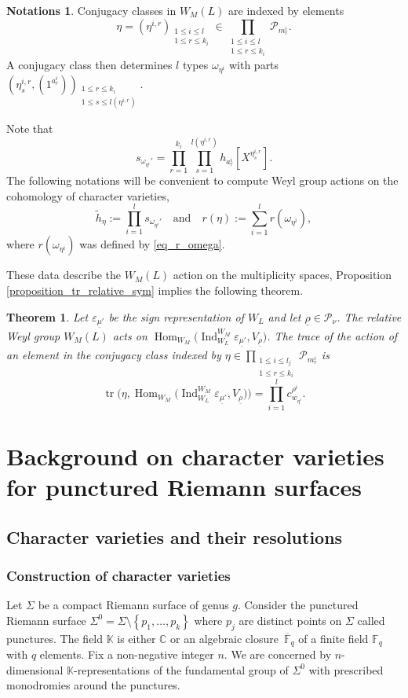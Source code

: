 \documentclass[11pt]{article}
\newcommand{\Subsection}{\subsection}
\newcommand{\quand}{\quad\text{and}\quad}
\let\epsilon\varepsilon
\theoremstyle{definition}
\newtheorem{notations}[definition]{Notations}
\theoremstyle{plain}
\newtheorem{theorem}[definition]{Theorem}
\DeclareMathOperator{\Hom}{Hom}
\DeclareMathOperator{\Ind}{Ind}
\DeclareMathOperator{\tr}{tr}
\newcommand{\C}{\mathbb{C}}
\newcommand{\Fq}{\mathbb{F}_q}
\newcommand{\Fqbar}{\overline{\mathbb{F}}_q}
\newcommand{\Part}{\mathcal{P}}
\begin{document}
\begin{notations}\label{notations_h_tilde}
Conjugacy classes in $W_M(L)$ are indexed by elements
\[
\eta=(\eta^{i,r})_{\substack{ 1 \le i \le l\\ 1 \le r \le k_{i}}} \in \prod_{\substack{ 1 \le i \le l \\ 1 \le r \le k_{i}}} \Part_{m^{i}_{r}}.
\]
A conjugacy class then determines $l$ types
$\omega_{\eta^i}$ with parts $(\eta^{i,r}_s,(1^{a^i_r}))_{\substack{ 1\le r \le k_i \\ 1\le s \le l(\eta^{i,r})}} $.

Note that
\[
s_{\omega_{\eta^i}'}= \prod_{r=1}^{k_i} \prod_{s=1}^{l(\eta^{i,r})} h_{a^i_r}[X^{\eta^{i,r}_s}].
\]
The following notations will be convenient to compute Weyl group actions on the cohomology of character varieties,
\[
\widetilde{h}_{\eta}:=\prod_{i=1}^l s_{\omega_{\eta^i}'}
\quand
r(\eta):=\sum_{i=1}^l r(\omega_{\eta^i}),
\]
where $r(\omega_{\eta^i})$ was defined by \eqref{eq_r_omega}.
\end{notations}

These data describe the $W_M(L)$ action on the multiplicity spaces, Proposition \ref{proposition_tr_relative_sym} implies the following theorem.
\begin{theorem}
Let $\epsilon_{\underline{\mu}'}$ be the sign representation of $W_L$ and let $\underline{\rho}\in\Part_{\nu}$. The relative Weyl group $W_M (L)$ acts on $\Hom_{W_M} \bigl(\Ind_{W_L}^{W_M} \epsilon_{\underline{\mu}'}, V_{\underline{\rho}}\bigr)$. The trace of the action of an element in the conjugacy class indexed by $\eta \in \prod_{\substack{ 1 \le i \le l_j \\ 1 \le r \le k_{i}}} \Part_{m^{i}_{r}}$ is
\[
\tr\bigl(\eta, \Hom_{W_M} \bigl(\Ind_{W_L}^{W_M} \epsilon_{\underline{\mu}'}, V_{\underline{\rho}}\bigr)\bigr) = \prod_{i=1}^{l} c^{\rho^i}_{w_{\eta^i}}.
\]
\end{theorem}

\section{Background on character varieties for punctured Riemann surfaces}\label{sect_background_char}
\Subsection{Character varieties and their resolutions}

\subsubsection{Construction of character varieties}
Let $\Sigma$ be a compact Riemann surface of genus $g$. Consider the punctured Riemann surface $\Sigma^0=\Sigma\setminus\left\lbrace p_1,\dots,p_k\right\rbrace$ where $p_j$ are distinct points on $\Sigma$ called punctures. The field $\mathbb{K}$ is either $\C$ or an algebraic closure~$\Fqbar$ of a finite field $\Fq$ with $q$ elements. Fix a non-negative integer $n$. We are concerned by $n$-dimensional $\mathbb{K}$-representations of the fundamental group of $\Sigma^0$ with prescribed monodromies around the punctures.
\end{document}
